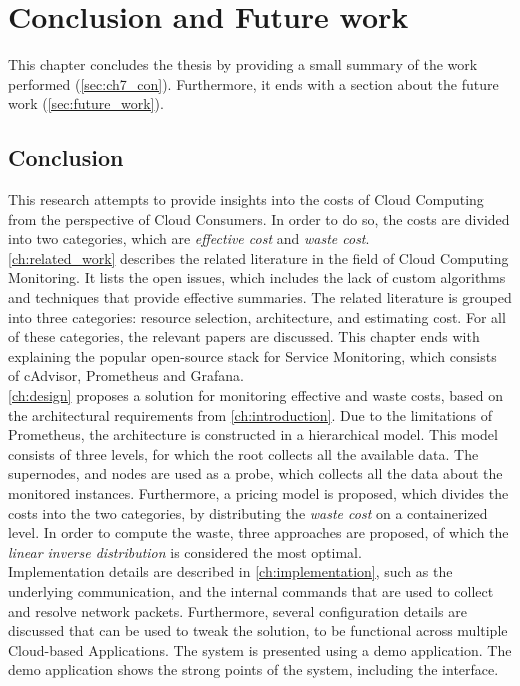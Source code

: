 \chapter{Conclusion and Future work}\label{ch:conclusion}
This chapter concludes the thesis by providing a small summary of the work performed (\autoref{sec:ch7_con}). Furthermore, it ends with a section about the future work (\autoref{sec:future_work}).

\section{Conclusion} \label{sec:ch7_con}
This research attempts to provide insights into the costs of Cloud Computing from the perspective of Cloud Consumers. In order to do so, the costs are divided into two categories, which are \textit{effective cost} and \textit{waste cost}.\\

\noindent
\autoref{ch:related_work} describes the related literature in the field of Cloud Computing Monitoring. It lists the open issues, which includes the lack of custom algorithms and techniques that provide effective summaries. The related literature is grouped into three categories: resource selection, architecture, and estimating cost. For all of these categories, the relevant papers are discussed. This chapter ends with explaining the popular open-source stack for Service Monitoring, which consists of cAdvisor, Prometheus and Grafana.\\

\noindent
\autoref{ch:design} proposes a solution for monitoring effective and waste costs, based on the architectural requirements from \autoref{ch:introduction}. Due to the limitations of Prometheus, the architecture is constructed in a hierarchical model. This model consists of three levels, for which the root collects all the available data. The supernodes, and nodes are used as a probe, which collects all the data about the monitored instances. Furthermore, a pricing model is proposed, which divides the costs into the two categories, by distributing the \textit{waste cost} on a containerized level. In order to compute the waste, three approaches are proposed, of which the \textit{linear inverse distribution} is considered the most optimal.\\

\noindent
Implementation details are described in \autoref{ch:implementation}, such as the underlying communication, and the internal commands that are used to collect and resolve network packets. Furthermore, several configuration details are discussed that can be used to tweak the solution, to be functional across multiple Cloud-based Applications. The system is presented using a demo application. The demo application shows the strong points of the system, including the interface.\\

